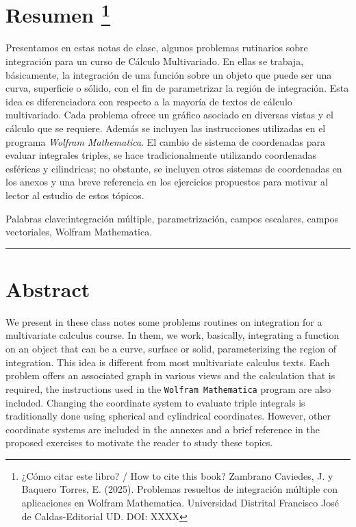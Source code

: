 \thispagestyle{empty}
\section*{\fontschap Resumen \footnote{¿Cómo citar este libro? / How to cite this book?
		Zambrano Caviedes, J. y Baquero Torres, E. (2025). Problemas resueltos de integración múltiple con aplicaciones en Wolfram Mathematica. Universidad Distrital Francisco José de Caldas-Editorial UD. DOI: XXXX}}

Presentamos en estas notas de clase, algunos problemas 
rutinarios sobre integración para un curso de Cálculo Multivariado. En ellas se trabaja, básicamente, la integración de una función sobre un objeto que puede ser una curva, superficie o sólido, con el fin de parametrizar la región de integración.
Esta idea es diferenciadora con respecto a la mayoría de textos de cálculo multivariado. Cada problema ofrece un gráfico asociado en diversas vistas y el cálculo que se requiere. Además se incluyen las instrucciones utilizadas en el programa  \emph{Wolfram Mathematica}. El cambio de sistema de coordenadas para evaluar integrales triples, se hace tradicionalmente utilizando coordenadas esféricas y cilindricas; no obstante, se incluyen otros sistemas de coordenadas en los anexos y una breve referencia en los ejercicios propuestos para motivar al lector al estudio de estos tópicos.

\fontschap Palabras clave:\normalfont integración múltiple, parametrización, campos escalares, campos vectoriales, Wolfram Mathematica.
\vspace{-0.7em} %

\noindent
\hspace*{-0.1cm} %
\rule{2cm}{0.5pt} %

\vspace{-0.5em} %



\section*{\fontschap Abstract}

We present in these class notes some problems 
routines on integration for a multivariate calculus course. In them, we work, basically, integrating a function on an object that can be a curve, surface or solid, parameterizing the region of integration.
This idea is different from most multivariate calculus texts. Each problem offers an associated graph in various views and the calculation that is required, the instructions used in the {\tt Wolfram Mathematica} program are also included. Changing the coordinate system to evaluate triple integrals is traditionally done using spherical and cylindrical coordinates. However, other coordinate systems are included in the annexes and a brief reference in the proposed exercises to motivate the reader to study these topics.

